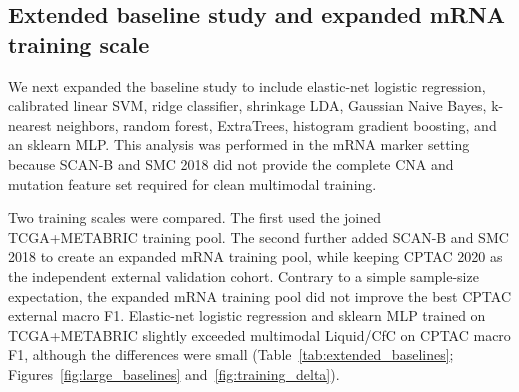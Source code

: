 \subsection{Extended baseline study and expanded mRNA training scale}

We next expanded the baseline study to include elastic-net logistic regression, calibrated linear SVM, ridge classifier, shrinkage LDA, Gaussian Naive Bayes, k-nearest neighbors, random forest, ExtraTrees, histogram gradient boosting, and an sklearn MLP. This analysis was performed in the mRNA marker setting because SCAN-B and SMC 2018 did not provide the complete CNA and mutation feature set required for clean multimodal training.

Two training scales were compared. The first used the joined TCGA+METABRIC training pool. The second further added SCAN-B and SMC 2018 to create an expanded mRNA training pool, while keeping CPTAC 2020 as the independent external validation cohort. Contrary to a simple sample-size expectation, the expanded mRNA training pool did not improve the best CPTAC external macro F1. Elastic-net logistic regression and sklearn MLP trained on TCGA+METABRIC slightly exceeded multimodal Liquid/CfC on CPTAC macro F1, although the differences were small (Table~\ref{tab:extended_baselines}; Figures~\ref{fig:large_baselines} and~\ref{fig:training_delta}).

\begin{table}[ht]
\centering
\caption{CPTAC external comparison after extended baseline analysis.}
\label{tab:extended_baselines}
\end{table}

